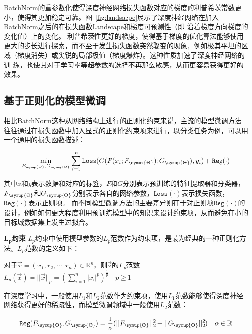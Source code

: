 BatchNorm的重参数化使得深度神经网络损失函数对应的梯度的利普希茨常数更小，使得其更加稳定可靠。图~\ref{fig:landsacpe}展示了深度神经网络在加入BatchNorm之后的在损失函数Landscape和梯度可预测性（即
沿着梯度方向梯度的变化值）上的变化。
利普希茨性更好的梯度，使得基于梯度的优化算法能够使用更大的步长进行探索，而不至于发生损失函数突然骤变的现象，例如极其平坦的区域（梯度消失）或尖锐的局部极值（梯度爆炸）。这种性质加速了深度神经网络的训
练，也使其对于学习率等超参数的选择不再那么敏感，从而更容易获得更好的效果。


\subsection{基于正则化的模型微调}
\label{section:regularize}
相比BatchNorm这种从网络结构上进行的正则化约束来说，主流的模型微调方法往往通过在损失函数中加入显式的正则化约束项来进行，以分类任务为例，可以用一个通用的损失函数描述：

\begin{equation}
\label{equal-finetune}
	\mathop {\min} \limits_{ F_{\symup{\Theta}}, G_{\symup{\Theta}}} \sum\limits_{i = 1}^n {\texttt{Loss}(G(F(x_i;F_{\symup{\Theta}});G_{\symup{\Theta}}),y_i)}  + \texttt{Reg} (\cdot)
\end{equation}

其中$x$和$y$表示数据和对应的标签，$F$和$G$分别表示预训练的特征提取器和分类器，$F_{\symup{\Theta}}$和$G_{\symup{\Theta}}$分别表示各自的网络参数，$\texttt{Loss} (\cdot)$表示损失函数，$\texttt{Reg} (\cdot)$表示正则项。
而不同模型微调方法的主要差异则在于对正则项$\texttt{Reg} (\cdot)$的设计，例如如何更大程度利用预训练模型中的知识来设计约束项，从而避免在小的目标域数据集上发生过拟合。

\textbf{$\bm{L_p}$约束 } $L_p$约束中使用模型参数的$L_p$范数作为约束项，是最为经典的一种正则化方法。$L_p$范数的定义如下：

\begin{definition}[$L_p$范数]
  对于$\vec{x}=(x_1, x_2, \cdots ,x_n) \in \mathbb{R}^n$，则$\vec{x}$的$L_p$范数$L_p(\vec{x})={\vert\vert \vec{x} \vert\vert}_p = (\sum_{i=1}^n {\vert x_i \vert}^p)^{\frac{1}{p}} \quad p \geq 1 $
\end{definition}

在深度学习中，一般使用$L_1$和$L_2$范数作为约束项，使用$L_1$范数能够使得深度神经网络获得更好的稀疏性，而模型微调领域中一般使用$L_2$范数：

\begin{equation}
  \texttt{Reg} (F_{\symup{\Theta}}, G_{\symup{\Theta}}) = \frac{1}{\alpha} (\vert\vert F_{\symup{\Theta}} \vert\vert_2^2 + \vert\vert G_{\symup{\Theta}} \vert\vert_2^2) \quad \alpha \in \mathbb{R}
\end{equation}

